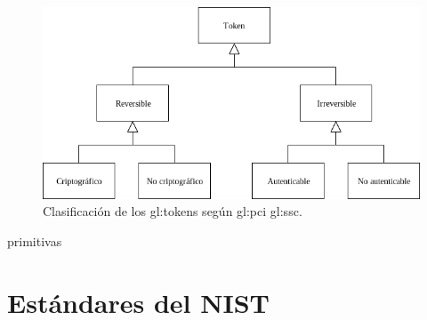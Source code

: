 \begin{figure}[h]
  \begin{center}
    \includegraphics[width=0.75\linewidth]{diagramas/clasificacion.png}
    \caption{Clasificación de los \glspl{gl:token}
      según \gls{gl:pci} \gls{gl:ssc}.}
    \label{fig:division_tokens}
  \end{center}
\end{figure}

{primitivas}

\section{Estándares del NIST}

